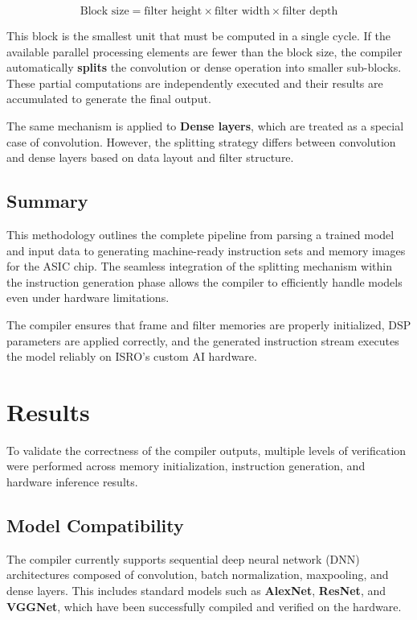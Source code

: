 \documentclass[12pt]{report}
\begin{document}
\[
\text{Block size} = \text{filter height} \times \text{filter width} \times \text{filter depth}
\]

This block is the smallest unit that must be computed in a single cycle. If the available parallel processing elements are fewer than the block size, the compiler automatically \textbf{splits} the convolution or dense operation into smaller sub-blocks. These partial computations are independently executed and their results are accumulated to generate the final output.

The same mechanism is applied to \textbf{Dense layers}, which are treated as a special case of convolution. However, the splitting strategy differs between convolution and dense layers based on data layout and filter structure.

\section{Summary}

This methodology outlines the complete pipeline from parsing a trained model and input data to generating machine-ready instruction sets and memory images for the ASIC chip. The seamless integration of the splitting mechanism within the instruction generation phase allows the compiler to efficiently handle models even under hardware limitations. 

The compiler ensures that frame and filter memories are properly initialized, DSP parameters are applied correctly, and the generated instruction stream executes the model reliably on ISRO’s custom AI hardware.

\chapter{Results}

To validate the correctness of the compiler outputs, multiple levels of verification were performed across memory initialization, instruction generation, and hardware inference results.

\section{Model Compatibility}

The compiler currently supports sequential deep neural network (DNN) architectures composed of convolution, batch normalization, maxpooling, and dense layers. This includes standard models such as \textbf{AlexNet}, \textbf{ResNet}, and \textbf{VGGNet}, which have been successfully compiled and verified on the hardware.
\end{document}
